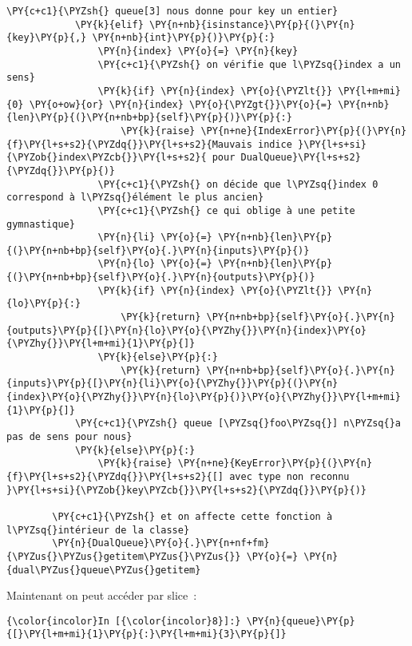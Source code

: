 \begin{Verbatim}[commandchars=\\\{\},frame=single,framerule=0.3mm,rulecolor=\color{cellframecolor}]
            \PY{c+c1}{\PYZsh{} queue[3] nous donne pour key un entier}
            \PY{k}{elif} \PY{n+nb}{isinstance}\PY{p}{(}\PY{n}{key}\PY{p}{,} \PY{n+nb}{int}\PY{p}{)}\PY{p}{:}
                \PY{n}{index} \PY{o}{=} \PY{n}{key}
                \PY{c+c1}{\PYZsh{} on vérifie que l\PYZsq{}index a un sens}
                \PY{k}{if} \PY{n}{index} \PY{o}{\PYZlt{}} \PY{l+m+mi}{0} \PY{o+ow}{or} \PY{n}{index} \PY{o}{\PYZgt{}}\PY{o}{=} \PY{n+nb}{len}\PY{p}{(}\PY{n+nb+bp}{self}\PY{p}{)}\PY{p}{:}
                    \PY{k}{raise} \PY{n+ne}{IndexError}\PY{p}{(}\PY{n}{f}\PY{l+s+s2}{\PYZdq{}}\PY{l+s+s2}{Mauvais indice }\PY{l+s+si}{\PYZob{}index\PYZcb{}}\PY{l+s+s2}{ pour DualQueue}\PY{l+s+s2}{\PYZdq{}}\PY{p}{)}
                \PY{c+c1}{\PYZsh{} on décide que l\PYZsq{}index 0 correspond à l\PYZsq{}élément le plus ancien}
                \PY{c+c1}{\PYZsh{} ce qui oblige à une petite gymnastique}
                \PY{n}{li} \PY{o}{=} \PY{n+nb}{len}\PY{p}{(}\PY{n+nb+bp}{self}\PY{o}{.}\PY{n}{inputs}\PY{p}{)}
                \PY{n}{lo} \PY{o}{=} \PY{n+nb}{len}\PY{p}{(}\PY{n+nb+bp}{self}\PY{o}{.}\PY{n}{outputs}\PY{p}{)}
                \PY{k}{if} \PY{n}{index} \PY{o}{\PYZlt{}} \PY{n}{lo}\PY{p}{:}
                    \PY{k}{return} \PY{n+nb+bp}{self}\PY{o}{.}\PY{n}{outputs}\PY{p}{[}\PY{n}{lo}\PY{o}{\PYZhy{}}\PY{n}{index}\PY{o}{\PYZhy{}}\PY{l+m+mi}{1}\PY{p}{]}
                \PY{k}{else}\PY{p}{:}
                    \PY{k}{return} \PY{n+nb+bp}{self}\PY{o}{.}\PY{n}{inputs}\PY{p}{[}\PY{n}{li}\PY{o}{\PYZhy{}}\PY{p}{(}\PY{n}{index}\PY{o}{\PYZhy{}}\PY{n}{lo}\PY{p}{)}\PY{o}{\PYZhy{}}\PY{l+m+mi}{1}\PY{p}{]}
            \PY{c+c1}{\PYZsh{} queue [\PYZsq{}foo\PYZsq{}] n\PYZsq{}a pas de sens pour nous}
            \PY{k}{else}\PY{p}{:}
                \PY{k}{raise} \PY{n+ne}{KeyError}\PY{p}{(}\PY{n}{f}\PY{l+s+s2}{\PYZdq{}}\PY{l+s+s2}{[] avec type non reconnu }\PY{l+s+si}{\PYZob{}key\PYZcb{}}\PY{l+s+s2}{\PYZdq{}}\PY{p}{)}
        
        \PY{c+c1}{\PYZsh{} et on affecte cette fonction à l\PYZsq{}intérieur de la classe}
        \PY{n}{DualQueue}\PY{o}{.}\PY{n+nf+fm}{\PYZus{}\PYZus{}getitem\PYZus{}\PYZus{}} \PY{o}{=} \PY{n}{dual\PYZus{}queue\PYZus{}getitem}
\end{Verbatim}


    Maintenant on peut accéder par slice~:

    \begin{Verbatim}[commandchars=\\\{\},frame=single,framerule=0.3mm,rulecolor=\color{cellframecolor}]
{\color{incolor}In [{\color{incolor}8}]:} \PY{n}{queue}\PY{p}{[}\PY{l+m+mi}{1}\PY{p}{:}\PY{l+m+mi}{3}\PY{p}{]}
\end{Verbatim}


